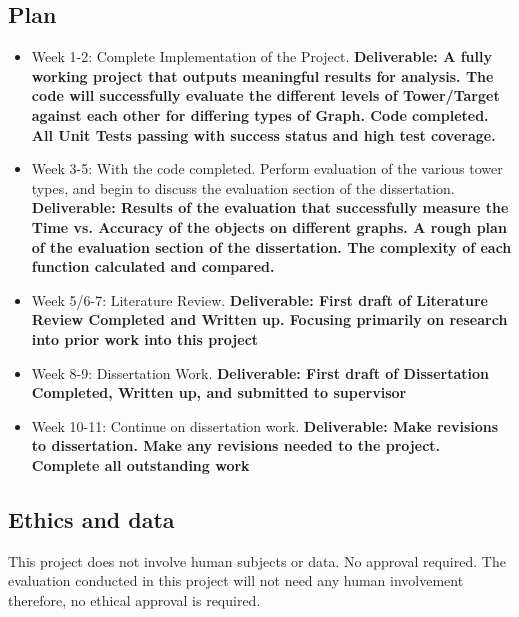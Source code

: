 \documentclass[11pt]{article}
\begin{document}
\subsection{Plan}\label{plan}
\begin{itemize}
    \tightlist
    \item
      Week 1-2: Complete Implementation of the Project. \textbf{Deliverable: A fully working project that outputs meaningful results for analysis. The code will successfully evaluate the different levels of Tower/Target against each other for differing types of Graph. Code completed. All Unit Tests passing with success status and high test coverage.} 
    \item
      Week 3-5: With the code completed. Perform evaluation of the various tower types, and begin to discuss the evaluation section of the dissertation. \textbf{Deliverable: Results of the evaluation that successfully measure the Time vs. Accuracy of the objects on different graphs. A rough plan of the evaluation section of the dissertation. The complexity of each function calculated and compared.}
    \item
      Week 5/6-7: Literature Review. 
      \textbf{Deliverable: First draft of Literature Review Completed and Written up. Focusing primarily on research into prior work into this project}
    \item
      Week 8-9: Dissertation Work. 
      \textbf{Deliverable: First draft of Dissertation Completed, Written up, and submitted to supervisor}
    \item
      Week 10-11: Continue on dissertation work. \textbf{Deliverable: Make revisions to dissertation. Make any revisions needed to the project. Complete all outstanding work}
    \end{itemize}
    
    
\subsection{Ethics and data}\label{ethics}

This project does not involve human subjects or data. No approval required. The evaluation conducted in this project will not need any human involvement therefore, no ethical approval is required. 
\end{document}
